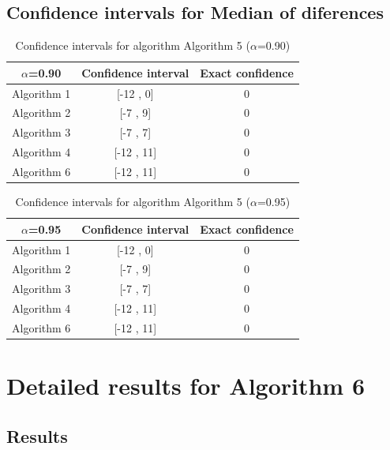 \documentclass[a4paper,10pt]{article}
\begin{document}
\subsection{Confidence intervals for Median of diferences}

\begin{table}[!htp]
\centering\small
\begin{tabular}{
|c|c|c|}
\hline
 $\alpha$=0.90 & Confidence interval & Exact confidence \\ \hline 
Algorithm 1 & [-12 , 0] & 0\\ \hline 
Algorithm 2 & [-7 , 9] & 0\\ \hline 
Algorithm 3 & [-7 , 7] & 0\\ \hline 
Algorithm 4 & [-12 , 11] & 0\\ \hline 
Algorithm 6 & [-12 , 11] & 0\\ \hline 

\end{tabular}
\caption{Confidence intervals for algorithm Algorithm 5 ($\alpha$=0.90)}
\end{table}
\begin{table}[!htp]
\centering\small
\begin{tabular}{
|c|c|c|}
\hline
 $\alpha$=0.95 & Confidence interval & Exact confidence \\ \hline 
Algorithm 1 & [-12 , 0] & 0\\ \hline 
Algorithm 2 & [-7 , 9] & 0\\ \hline 
Algorithm 3 & [-7 , 7] & 0\\ \hline 
Algorithm 4 & [-12 , 11] & 0\\ \hline 
Algorithm 6 & [-12 , 11] & 0\\ \hline 

\end{tabular}
\caption{Confidence intervals for algorithm Algorithm 5 ($\alpha$=0.95)}
\end{table}

 \clearpage 


\section{Detailed results for Algorithm 6}


\subsection{Results}
\end{document}
